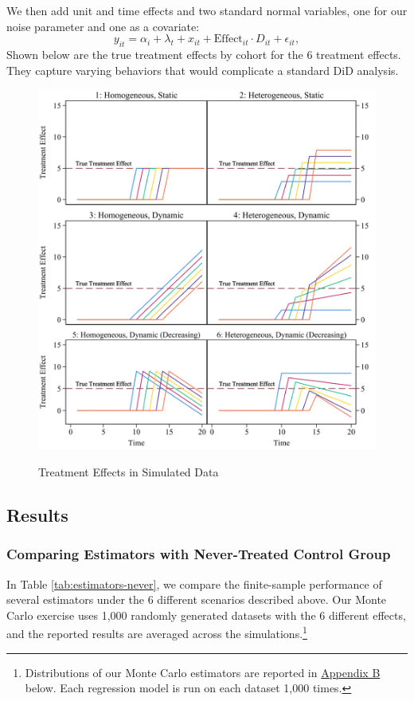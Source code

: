 \documentclass[12pt]{article}
\begin{document}
We then add unit and time effects and two standard normal variables, one for our noise parameter and one as a covariate:
\begin{equation}
     y_{it} = \alpha_i + \lambda_t + x_{it} + \text{Effect}_{it} \cdot D_{it} + \epsilon_{it},
\end{equation}
Shown below are the true treatment effects by cohort for the 6 treatment effects. They capture varying behaviors that would complicate a standard DiD analysis.
\begin{figure}[H]
    \centering
    \caption{Treatment Effects in Simulated Data}
    \includegraphics[width=6in]{Figures/Table 1 Treatment Effects Chart.jpg}
    \label{fig:treat-effects}
\end{figure}
\subsection{Results}
\subsubsection{Comparing Estimators with Never-Treated Control Group}
In Table \ref{tab:estimators-never}, we compare the finite-sample performance of several estimators under the 6 different scenarios described above. Our Monte Carlo exercise uses 1,000 randomly generated datasets with the 6 different effects, and the reported results are averaged across the simulations.\footnote{Distributions of our Monte Carlo estimators are reported in \hyperref[sec:appendixb]{Appendix B} below. Each regression model is run on each dataset 1,000 times.}
\end{document}
